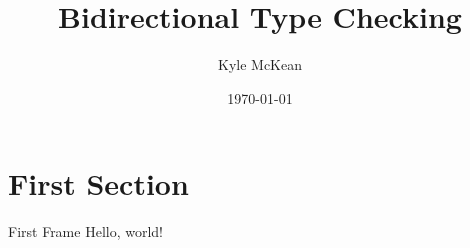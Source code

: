 \documentclass{beamer}
\title{Bidirectional Type Checking}
\date{\today}
\author{Kyle McKean}
\institute{Reed Student Colloquium}
\begin{document}
  \maketitle
  \section{First Section}
  \begin{frame}{First Frame}
    Hello, world!
  \end{frame}
\end{document}
